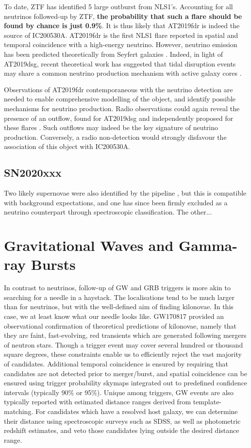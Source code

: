To date, ZTF has identified 5 large outburst from NLS1's. Accounting for all neutrinos followed-up by ZTF, \textbf{the probability that such a flare should be found by chance is just 0.9\%}. It is thus likely that AT2019fdr is indeed the source of IC200530A. AT2019fdr is the first NLS1 flare reported in spatial and temporal coincidence with a high-energy neutrino. However, neutrino emission has been predicted theoretically from Seyfert galaxies \cite[see e.g]{murase_agn}. Indeed, in light of AT2019dsg, recent theoretical work has suggested that tidal disruption events may share a common neutrino production mechanism with active galaxy cores . 

Observations of AT2019fdr contemporaneous with the neutrino detection are needed to enable comprehensive modelling of the object, and identify possible mechanisms for neutrino production. Radio observations could again reveal the presence of an outflow, found for AT2019dsg and independently proposed for these flares \cite{trakhtenbrot19}. Such outflows may indeed be the key signature of neutrino production. Conversely, a radio non-detection would strongly disfavour the association of this object with IC200530A.
%
\subsection{SN2020xxx}

Two likely supernovae were also identified by the pipeline \cite{ztf_IC200530A}, but this is compatible with background expectations, and one has since been firmly excluded as a neutrino counterpart through spectroscopic classification. The other...

\section{Gravitational Waves and Gamma-ray Bursts}
In contrast to neutrinos, follow-up of GW and GRB triggers is more akin to searching for a needle in a haystack. The localisations tend to be much larger than for neutrinos, but with the well-defined aim of finding kilonovae. In this case, we at least know what our needle looks like. GW170817 provided an observational confirmation of theoretical predictions of kilonovae, namely that they are faint, fast-evolving, red transients which are generated following mergers of neutron stars. Though a trigger event may cover several hundred or thousand square degrees, these constraints enable us to efficiently reject the vast majority of candidates. Additional temporal coincidence is ensured by requiring that candidates are not detected prior to merger/burst, and spatial coincidence can be ensured using trigger probability skymaps integrated out to predefined confidence intervals (typically 90\% or 95\%). Unique among triggers, GW events are also typically reported with estimated distance ranges derived from template-matching. For candidates which have a resolved host galaxy, we can determine their distance using spectroscopic surveys such as SDSS, as well as photometric redshift estimates, and veto those candidates lying outside the desired distance range.

